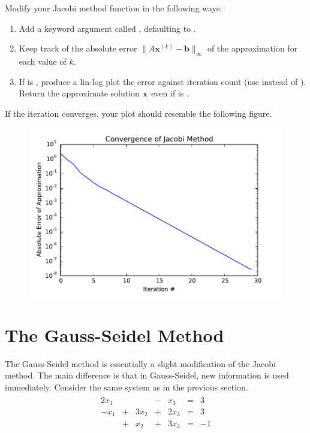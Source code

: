 \begin{problem}
Modify your Jacobi method function in the following ways:
\begin{enumerate}
    \item Add a keyword argument called , defaulting to .
    \item Keep track of the absolute error $\|A\mathbf{x}^{(k)} - \mathbf{b}\|_{\infty}$ of the approximation for each value of $k$.
    \item If  is , produce a lin-log plot the error against iteration count (use  instead of ).
    Return the approximate solution $\mathbf{x}$ even if  is .
\end{enumerate}
If the iteration converges, your plot should resemble the following figure.

\begin{figure}[H]
    \includegraphics[width=.7\textwidth]{jacobi_convergence.pdf}
\end{figure}

\label{prob:plot-iterative-convergence}
\end{problem}

\section*{The Gauss-Seidel Method} %

The Gauss-Seidel method is essentially a slight modification of the Jacobi method.
The main difference is that in Gauss-Seidel, new information is used immediately.
Consider the same system as in the previous section.
\begin{align*}
\begin{array}{ccccccc}
  2x_1 &   &      & - & x_3  & = & 3  \\
  -x_1 & + & 3x_2 & + & 2x_3 & = & 3  \\
       & + & x_2  & + & 3x_3 & = & -1 \\
\end{array}
\end{align*}

